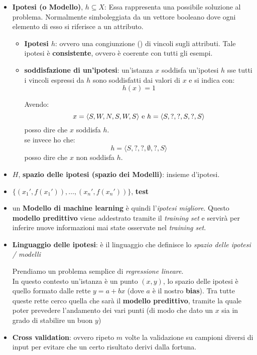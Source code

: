 \begin{shaded}
\begin{itemize}
    \item \textbf{Ipotesi (o Modello)}, $h\subseteq X$: Essa rappresenta una possibile soluzione al problema. Normalmente simboleggiata da un vettore booleano dove ogni elemento di esso si riferisce a un attributo.
    \begin{itemize}
        \item \textbf{Ipotesi $h$}: ovvero una congiunzione (\textb{$$\land$}) di vincoli sugli
    attributi. Tale ipotesi è \textbf{consistente}, ovvero è coerente con tutti gli esempi.
    \item \textbf{soddisfazione di un'ipotesi}: un'istanza $x$ soddisfa
    un'ipotesi $h$ sse tutti i vincoli espressi da $h$ sono soddisfatti dai
    valori di $x$ e si indica con:
    \[h(x)=1\]
    \begin{esempio}
      Avendo:
      \[x=\langle S,W,N,S,W,S\rangle \mbox{ \textnormal{e}
        }h=\langle S,?,?,S,?,S\rangle\]
      posso dire che $x$ soddisfa $h$.\\
      se invece ho che:
      \[h=\langle S,?,?,\emptyset,?,S\rangle\]
      posso dire che $x$ non soddisfa $h$.
    \end{esempio} 
    \end{itemize}
    
    \item $H$, \textbf{spazio delle ipotesi (spazio dei Modelli)}: insieme d'ipotesi.
    
    
    \item $\{(x_1',f(x_1')),\ldots,(x_n',f(x_n'))\}$, \textbf{test}
    
    
    \item un \textbf{Modello di machine learning} è
    quindi l'\textit{ipotesi migliore}. Questo \textbf{modello predittivo} viene
    addestrato tramite il \textit{training set} e servirà per inferire nuove
    informazioni mai state osservate nel \textit{training set}. 
    
    
    \item \textbf{Linguaggio delle ipotesi}: è il linguaggio che definisce lo
    \textit{spazio delle ipotesi / modelli}
    \begin{esempio}
      Prendiamo un problema semplice di \textit{regressione lineare}.\\
      In questo contesto un'istanza è un punto $(x,y)$, lo spazio delle ipotesi
      è quello formato dalle rette $y=a+bx$ (dove $a$ è il nostro
      \textbf{bias}). Tra tutte queste rette cerco quella che sarà il
      \textbf{modello predittivo}, tramite la quale poter prevedere l'andamento
      dei vari punti (di modo che dato un $x$ sia in grado di stabilire un buon
      $y$)
    \end{esempio}
    
    \item \textbf{Cross validation}: ovvero ripeto $m$ volte la validazione su
    campioni diversi di input per evitare che un certo risultato derivi dalla
    fortuna. 
  \end{itemize}
\end{shaded}


